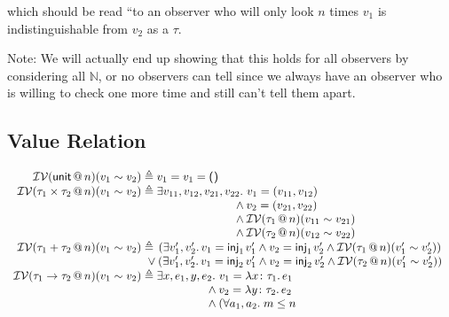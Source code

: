 \documentclass{lecturenotes}
\makeatletter
\newcommand{\spa}{\mkern5mu}
\newcommand{\inval}[4]{\ensuremath{\mathcal{I}\mathcal{V}(#1 \mkern3mu @ \mkern3mu #2)(#3 \sim #4})}
\newcommand{\tabs}[3]{\ensuremath{\lambda #1 \colon #2.\,#3}}
\newcommand{\utype}{\textsf{unit}\xspace}
\newcommand{\unit}{\ensuremath{\textsf{(}\mkern0.5mu\textsf{)}}}
\newcommand{\prodtype}[2]{\ensuremath{#1 \times #2}}
\newcommand{\sumtype}[2]{\ensuremath{#1 + #2}}
\newcommand{\injl}[1]{\ensuremath{\textsf{inj}_1\mkern2mu#1}}
\newcommand{\injr}[1]{\ensuremath{\textsf{inj}_2\mkern3mu#1}}
\makeatother
\begin{document}
  which should be read ``to an observer who will only look $n$ times $v_1$ is indistinguishable from $v_2$ as a $\tau$.

  Note: We will actually end up showing that this holds for all observers by considering all $\mathbb{N}$, or no observers can tell since we always have an observer who is willing to check one more time and still can't tell them apart. 

\subsection{Value Relation}

$$\begin{array}{r@{\;\triangleq\;}l} 
  \inval{\utype}{n}{v_1}{v_2} 
    & v_1 = v_1 = \unit 
  \\
  \inval{\prodtype{\tau_1}\tau_2{}}{n}{v_1}{v_2} 
    & \exists v_{11}, v_{12}, v_{21}, v_{22}.\, \hspace{-1.5em}
    \begin{array}[t]{l}\hspace{1.15em}
      v_1 = (v_{11}, v_{12})\\ 
      {} \land v_2 = (v_{21}, v_{22})\\ 
      {} \land \inval{\tau_1}{n}{v_{11}}{v_{21}}\\ 
      {} \land  \inval{\tau_2}{n}{v_{12}}{v_{22}} 
    \end{array}
  \\[1em]
  \inval{\sumtype{\tau_1}{\tau_2}}{n}{v_1}{v_2} 
    & \hspace{-1.5em}
    \begin{array}[t]{l}\hspace{1.15em}(\exists v'_1, v'_2.\, v_1 = \injl{v'_1} \land v_2 = \injl{v'_2} \land \inval{\tau_1}{n}{v'_1}{v'_2})\\ 
    {} \lor (\exists v'_1, v'_2.\,v_1 = \injr{v'_1} \land v_2 = \injr{v'_2} \land \inval{\tau_2}{n}{v'_1}{v'_2})\end{array} 
  \\[1em]
  \inval{\tau_1 \to \tau_2}{n}{v_1}{v_2} 
    & \exists x, e_1, y, e_2.\, \hspace{-1.5em}
    \begin{array}[t]{l}\hspace{1.15em}
      v_1 = \tabs{x}{\tau_1}{e_1}\\
      {} \land v_2 = \tabs{y}{\tau_2}{e_2}\\
      {} \land (\forall a_1, a_2. \spa m \leq n \\ 

\end{array}
\end{array}$$
\end{document}
